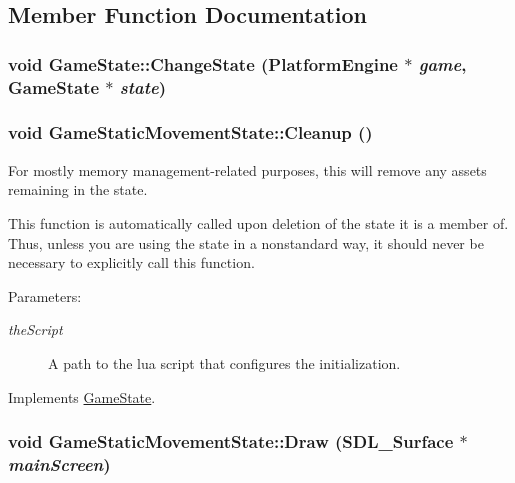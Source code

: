 \subsection{Member Function Documentation}
\hypertarget{class_game_state_f786aeb704a22a135dc289bb89fcc452}{
\subsubsection[{ChangeState}]{\setlength{\rightskip}{0pt plus 5cm}void GameState::ChangeState ({\bf PlatformEngine} $\ast$ {\em game}, \/  {\bf GameState} $\ast$ {\em state})}}
\label{dd/d87/class_game_state_f786aeb704a22a135dc289bb89fcc452}


\hypertarget{class_game_static_movement_state_072662abaf5a872f7919e7fc44200a04}{
\subsubsection[{Cleanup}]{\setlength{\rightskip}{0pt plus 5cm}void GameStaticMovementState::Cleanup ()}}
\label{d7/d3b/class_game_static_movement_state_072662abaf5a872f7919e7fc44200a04}


For mostly memory management-related purposes, this will remove any assets remaining in the state.

This function is automatically called upon deletion of the state it is a member of. Thus, unless you are using the state in a nonstandard way, it should never be necessary to explicitly call this function.

\begin{Desc}
\item[Parameters:]
\begin{description}
\item[{\em theScript}]A path to the lua script that configures the initialization. \end{description}
\end{Desc}


Implements \hyperlink{class_game_state_041e7a5430d71da84745af11abdacd93}{GameState}.\hypertarget{class_game_static_movement_state_2c2d82b3dbc8e431682b53ce05294f27}{
\subsubsection[{Draw}]{\setlength{\rightskip}{0pt plus 5cm}void GameStaticMovementState::Draw (SDL\_\-Surface $\ast$ {\em mainScreen})}}
\label{d7/d3b/class_game_static_movement_state_2c2d82b3dbc8e431682b53ce05294f27}


